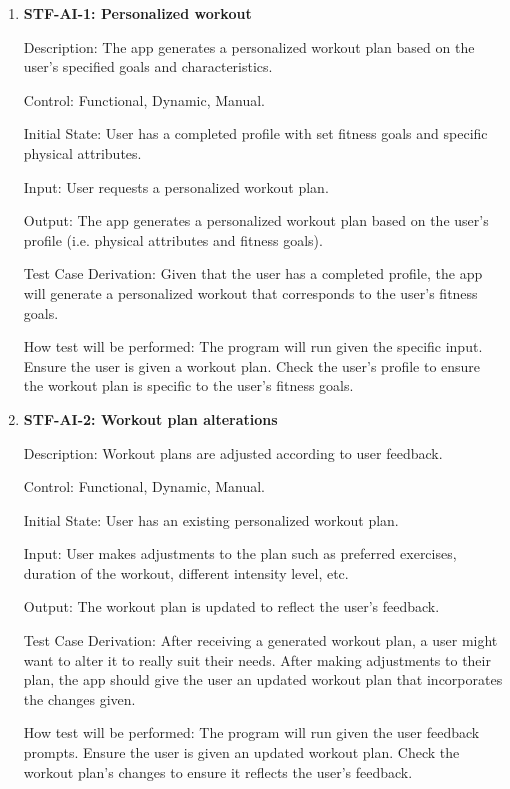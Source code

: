 \documentclass[12pt, titlepage]{article}
\begin{document}
\begin{enumerate}

\item{\textbf{STF-AI-1: Personalized workout}\\}

Description: The app generates a personalized workout plan based on the user’s specified goals and characteristics.
	
Control: Functional, Dynamic, Manual.

Initial State: User has a completed profile with set fitness goals and specific physical attributes.

Input: User requests a personalized workout plan.

Output: The app generates a personalized workout plan based on the user’s profile (i.e. physical attributes and fitness goals).

Test Case Derivation: Given that the user has a completed profile, the app will generate a personalized workout that corresponds to the user’s fitness goals.

How test will be performed: The program will run given the specific input. Ensure the user is given a workout plan. Check the user’s profile to ensure the workout plan is specific to the user’s fitness goals.
					
\item{\textbf{STF-AI-2: Workout plan alterations}\\}

Description: Workout plans are adjusted according to user feedback.
	
Control: Functional, Dynamic, Manual.

Initial State: User has an existing personalized workout plan.

Input: User makes adjustments to the plan such as preferred exercises, duration of the workout, different intensity level, etc. 

Output: The workout plan is updated to reflect the user’s feedback.

Test Case Derivation: After receiving a generated workout plan, a user might want to alter it to really suit their needs. After making adjustments to their plan, the app should give the user an updated workout plan that incorporates the changes given.

How test will be performed: The program will run given the user feedback prompts. Ensure the user is given an updated workout plan. Check the workout plan’s changes to ensure it reflects the user’s feedback.


\end{enumerate}
\end{document}
